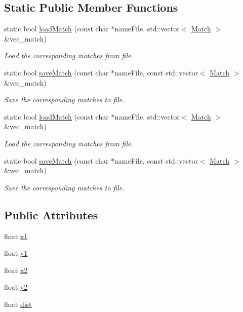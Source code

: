 \subsection*{Static Public Member Functions}
\begin{DoxyCompactItemize}
\item 
static bool \hyperlink{structMatch_a114d8e35da70144ca8f8c326fe38d568}{load\+Match} (const char $\ast$name\+File, std\+::vector$<$ \hyperlink{structMatch}{Match} $>$ \&vec\+\_\+match)
\begin{DoxyCompactList}\small\item\em Load the corresponding matches from file. \end{DoxyCompactList}\item 
static bool \hyperlink{structMatch_a78f2c4beb277712897e2a525c553670b}{save\+Match} (const char $\ast$name\+File, const std\+::vector$<$ \hyperlink{structMatch}{Match} $>$ \&vec\+\_\+match)
\begin{DoxyCompactList}\small\item\em Save the corresponding matches to file. \end{DoxyCompactList}\item 
static bool \hyperlink{structMatch_a114d8e35da70144ca8f8c326fe38d568}{load\+Match} (const char $\ast$name\+File, std\+::vector$<$ \hyperlink{structMatch}{Match} $>$ \&vec\+\_\+match)
\begin{DoxyCompactList}\small\item\em Load the corresponding matches from file. \end{DoxyCompactList}\item 
static bool \hyperlink{structMatch_a78f2c4beb277712897e2a525c553670b}{save\+Match} (const char $\ast$name\+File, const std\+::vector$<$ \hyperlink{structMatch}{Match} $>$ \&vec\+\_\+match)
\begin{DoxyCompactList}\small\item\em Save the corresponding matches to file. \end{DoxyCompactList}\end{DoxyCompactItemize}
\subsection*{Public Attributes}
\begin{DoxyCompactItemize}
\item 
float \hyperlink{structMatch_ad9303951c0ba135df63f7395e826ee30}{x1}
\item 
float \hyperlink{structMatch_a9f14370878085f208b95442ef5b6221c}{y1}
\item 
float \hyperlink{structMatch_a570dcc9633318cd3fb6f269f04f63d1a}{x2}
\item 
float \hyperlink{structMatch_ad266af2f32a1b4533e3a66d963bae22c}{y2}
\item 
float \hyperlink{structMatch_a391f8676df42073c211a5679cb664f0b}{dist}
\end{DoxyCompactItemize}
